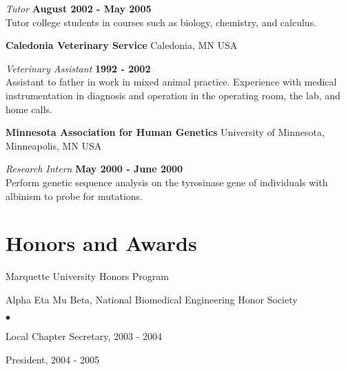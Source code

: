 \documentclass[margin,line]{res}
\newenvironment{list2}{
  \begin{list}{$\bullet$}{%
      \setlength{\itemsep}{0in}
      \setlength{\parsep}{0in} \setlength{\parskip}{0in}
      \setlength{\topsep}{0in} \setlength{\partopsep}{0in} 
      \setlength{\leftmargin}{0.2in}}}{\end{list}}
\begin{document}
\begin{resume}
\vspace{-.3cm}
{\em Tutor} \hfill {\bf August 2002 - May 2005} \\
Tutor college students in courses such as biology, chemistry, and calculus.

{\bf Caledonia Veterinary Service} Caledonia, MN USA

\vspace{-.3cm}
{\em Veterinary Assistant} \hfill {\bf 1992 - 2002} \\
Assistant to father in work in mixed animal practice.  Experience with medical instrumentation in diagnosis and operation in the operating room, the lab, and home calls.

{\bf Minnesota Association for Human Genetics} University of Minnesota, Minneapolis, MN USA

\vspace{-.3cm}
{\em Research Intern} \hfill {\bf May 2000 - June 2000} \\
Perform genetic sequence analysis on the tyrosinase gene of individuals with albinism to probe for mutations.

% 

\section{\sc Honors and Awards} 
Marquette University Honors Program

Alpha Eta Mu Beta, National Biomedical Engineering Honor Society
\begin{list2}
 \item Local Chapter Secretary, 2003 - 2004
 \item President, 2004 - 2005
\end{list2}
 

\end{resume}
\end{document}
